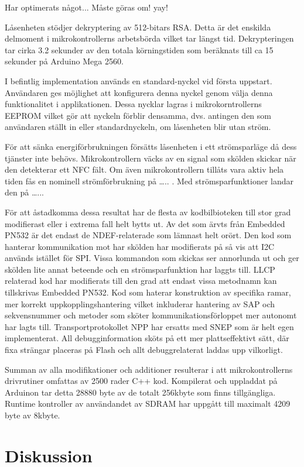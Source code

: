 \documentclass[11pt]{article}
\begin{document}
Har optimerats något... Måste göras om! yay!

Låsenheten stödjer dekryptering av 512-bitars RSA. Detta är det enskilda delmoment i mikrokontrollerns arbetsbörda vilket tar längst tid. Dekrypteringen tar cirka 3.2 sekunder av den totala körningstiden som beräknats till ca 15 sekunder på Arduino Mega 2560. 

I befintlig implementation används en standard-nyckel vid första uppstart. Användaren ges möjlighet att konfigurera denna nyckel genom välja denna funktionalitet i applikationen. Dessa nycklar lagras i mikrokorntrollerns EEPROM vilket gör att nyckeln förblir densamma, dvs. antingen den som användaren ställt in eller standardnyckeln, om låsenheten blir utan ström. 

För att sänka energiförbrukningen försätts låsenheten i ett strömsparläge då dess tjänster inte behövs. Mikrokontrollern väcks av en signal som skölden skickar när den detekterar ett NFC fält. Om även mikrokontrollern tillåts vara aktiv hela tiden fås en nominell strömförbrukning på ….. . Med strömsparfunktioner landar den på …...

För att åstadkomma dessa resultat har de flesta av kodbilbioteken till stor grad modifierast eller i extrema fall helt bytts ut. Av det som ärvts från Embedded PN532 är det endast de NDEF-relaterade som lämnast helt orört. Den kod som hanterar kommunikation mot har skölden har modifierats på så vis att  I2C används istället för SPI. Vissa kommandon som skickas ser annorlunda ut och ger skölden lite annat beteende och en strömsparfunktion har laggts till. LLCP relaterad kod har modifierats till den grad att endast vissa metodnamn kan tillskrivas Embedded PN532. Kod som haterar konstruktion av specifika ramar, mer korrekt uppkopplingshantering vilket inkluderar hantering av SAP och sekvensnummer och metoder som sköter kommunikationsförloppet mer autonomt har lagts till. Transportprotokollet NPP har ersatts med SNEP som är helt egen implementerat. All debugginformation sköts på ett mer plattseffektivt sätt, där fixa strängar placeras på Flash och allt debuggrelaterat laddas upp vilkorligt.

Summan av alla modifikationer och additioner resulterar i att mikrokontrollerns drivrutiner omfattas av 2500 rader C++ kod. Kompilerat och uppladdat på Arduinon tar detta 28880 byte av de totalt 256kbyte som finns tillgängliga. Runtime kontroller av användandet av SDRAM har uppgått till maximalt 4209 byte av 8kbyte.  

\section{Diskussion}
\end{document}
